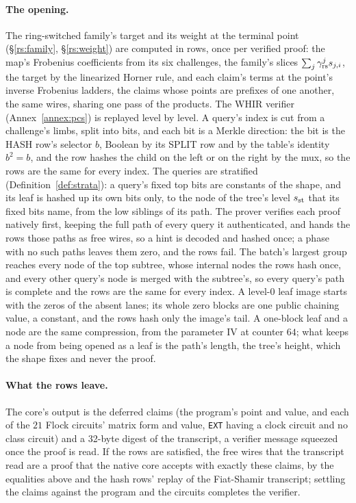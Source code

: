 \paragraph{The opening.} The ring-switched family's target and its weight at the terminal point (\S\ref{rs:family}, \S\ref{rs:weight}) are computed in rows, once per verified proof: the map's Frobenius coefficients from its six challenges, the family's slices $\sum_j\gamma_{\mathrm{rs}}^j s_{j,i}$, the target by the linearized Horner rule, and each claim's terms at the point's inverse Frobenius ladders, the claims whose points are prefixes of one another, the same wires, sharing one pass of the products. The WHIR verifier (Annex~\ref{annex:pcs}) is replayed level by level. A query's index is cut from a challenge's limbs, split into bits, and each bit is a Merkle direction: the bit is the \textsf{HASH} row's selector $b$, Boolean by its \textsf{SPLIT} row and by the table's identity $b^2=b$, and the row hashes the child on the left or on the right by the mux, so the rows are the same for every index. The queries are stratified (Definition~\ref{def:strata}): a query's fixed top bits are constants of the shape, and its leaf is hashed up its own bits only, to the node of the tree's level $s_{\mathrm{st}}$ that its fixed bits name, from the low siblings of its path. The prover verifies each proof natively first, keeping the full path of every query it authenticated, and hands the rows those paths as free wires, so a hint is decoded and hashed once; a phase with no such paths leaves them zero, and the rows fail. The batch's largest group reaches every node of the top subtree, whose internal nodes the rows hash once, and every other query's node is merged with the subtree's, so every query's path is complete and the rows are the same for every index. A level-$0$ leaf image starts with the zeros of the absent lanes; its whole zero blocks are one public chaining value, a constant, and the rows hash only the image's tail. A one-block leaf and a node are the same compression, from the parameter IV at counter $64$; what keeps a node from being opened as a leaf is the path's length, the tree's height, which the shape fixes and never the proof.

\paragraph{What the rows leave.} The core's output is the deferred claims (the program's point and value, and each of the $21$ Flock circuits' matrix form and value, \texttt{EXT} having a clock circuit and no class circuit) and a 32-byte digest of the transcript, a verifier message squeezed once the proof is read. If the rows are satisfied, the free wires that the transcript read are a proof that the native core accepts with exactly these claims, by the equalities above and the hash rows' replay of the Fiat-Shamir transcript; settling the claims against the program and the circuits completes the verifier.

